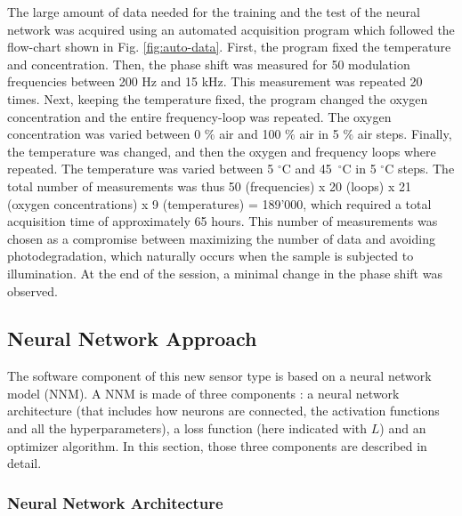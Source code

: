 \documentclass[final,5p,times,twocolumn]{elsarticle}
\begin{document}
The large amount of data needed for the training and the test of the neural network was acquired using an automated acquisition program which followed the flow-chart shown in Fig. \ref{fig:auto-data}. First, the program fixed the temperature and concentration. Then, the phase shift was measured for 50 modulation frequencies between 200 Hz and 15 kHz. This measurement was repeated 20 times. Next, keeping the temperature fixed, the program changed the oxygen concentration and the entire frequency-loop was repeated.
The oxygen concentration was varied between 0 $\%$ air and 100 $\%$ air in 5 $\%$ air steps.
Finally, the temperature was changed, and then the oxygen and frequency loops where repeated. The temperature was varied between 5 $^\circ$C and 45~$^\circ$C in 5 $^\circ$C steps.
The total number of measurements was thus 50 (frequencies) x 20 (loops) x 21 (oxygen concentrations) x 9 (temperatures) = 189'000, which required a total acquisition time of approximately 65 hours. This number of measurements was chosen as a compromise between maximizing the number of data and avoiding photodegradation, which naturally occurs when the sample is subjected to illumination. At the end of the session, a minimal change in the phase shift was observed.



\subsection{Neural Network Approach}
\label{NN}

The software component of this new sensor type is based on a neural network model (NNM). A NNM is made of three components \cite{Michelucci2017}: a neural network architecture (that includes how neurons are connected, the activation functions and all the hyperparameters), a loss function (here indicated with $L$) and an optimizer algorithm. In this section, those three components are described in detail.

\subsubsection{Neural Network Architecture}
\end{document}
